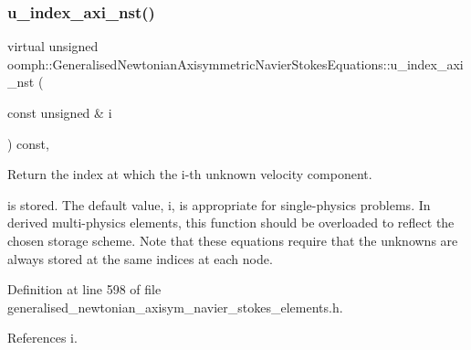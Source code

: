 \subsubsection{\texorpdfstring{u\+\_\+index\+\_\+axi\+\_\+nst()}{u\_index\_axi\_nst()}}
{\footnotesize\ttfamily virtual unsigned oomph\+::\+Generalised\+Newtonian\+Axisymmetric\+Navier\+Stokes\+Equations\+::u\+\_\+index\+\_\+axi\+\_\+nst (\begin{DoxyParamCaption}\item[{const unsigned \&}]{i }\end{DoxyParamCaption}) const\hspace{0.3cm}{\ttfamily [inline]}, {\ttfamily [virtual]}}



Return the index at which the i-\/th unknown velocity component. 

is stored. The default value, i, is appropriate for single-\/physics problems. In derived multi-\/physics elements, this function should be overloaded to reflect the chosen storage scheme. Note that these equations require that the unknowns are always stored at the same indices at each node. 

Definition at line 598 of file generalised\+\_\+newtonian\+\_\+axisym\+\_\+navier\+\_\+stokes\+\_\+elements.\+h.



References i.



